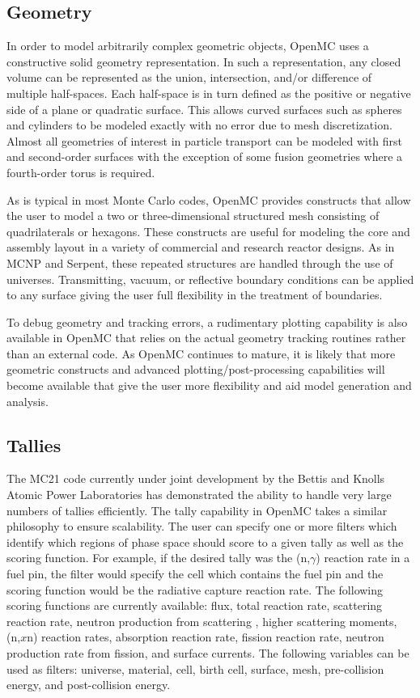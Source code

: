\documentclass[authoryear,preprint]{elsarticle}
\begin{document}
\subsection{Geometry}

In order to model arbitrarily complex geometric objects, OpenMC uses a
constructive solid geometry representation. In such a representation, any closed
volume can be represented as the union, intersection, and/or difference of
multiple half-spaces. Each half-space is in turn defined as the positive or
negative side of a plane or quadratic surface. This allows curved surfaces such
as spheres and cylinders to be modeled exactly with no error due to mesh
discretization. Almost all geometries of interest in particle transport can be
modeled with first and second-order surfaces with the exception of some fusion
geometries where a fourth-order torus is required.

As is typical in most Monte Carlo codes, OpenMC provides constructs that allow
the user to model a two or three-dimensional structured mesh consisting of
quadrilaterals or hexagons. These constructs are useful for modeling the core
and assembly layout in a variety of commercial and research reactor designs. As
in MCNP and Serpent, these repeated structures are handled through the use of
universes. Transmitting, vacuum, or reflective boundary conditions can be
applied to any surface giving the user full flexibility in the treatment of
boundaries.

To debug geometry and tracking errors, a rudimentary plotting capability is also
available in OpenMC that relies on the actual geometry tracking routines rather
than an external code. As OpenMC continues to mature, it is likely that more
geometric constructs and advanced plotting/post-processing capabilities will
become available that give the user more flexibility and aid model generation
and analysis.

\subsection{Tallies}
\label{sec:tallies}


The MC21 code currently under joint development by the Bettis and Knolls Atomic
Power Laboratories \citep{mc21} has demonstrated the ability to handle very
large numbers of tallies efficiently. The tally capability in OpenMC takes a
similar philosophy to ensure scalability. The user can specify one or more
filters which identify which regions of phase space should score to a given
tally as well as the scoring function. For example, if the desired tally was the
(n,$\gamma$) reaction rate in a fuel pin, the filter would specify the cell
which contains the fuel pin and the scoring function would be the radiative
capture reaction rate. The following scoring functions are currently available:
flux, total reaction rate, scattering reaction rate, neutron production from
scattering \citep{herman}, higher scattering moments, (n,$x$n) reaction rates,
absorption reaction rate, fission reaction rate, neutron production rate from
fission, and surface currents. The following variables can be used as filters:
universe, material, cell, birth cell, surface, mesh, pre-collision energy, and
post-collision energy.
\end{document}

